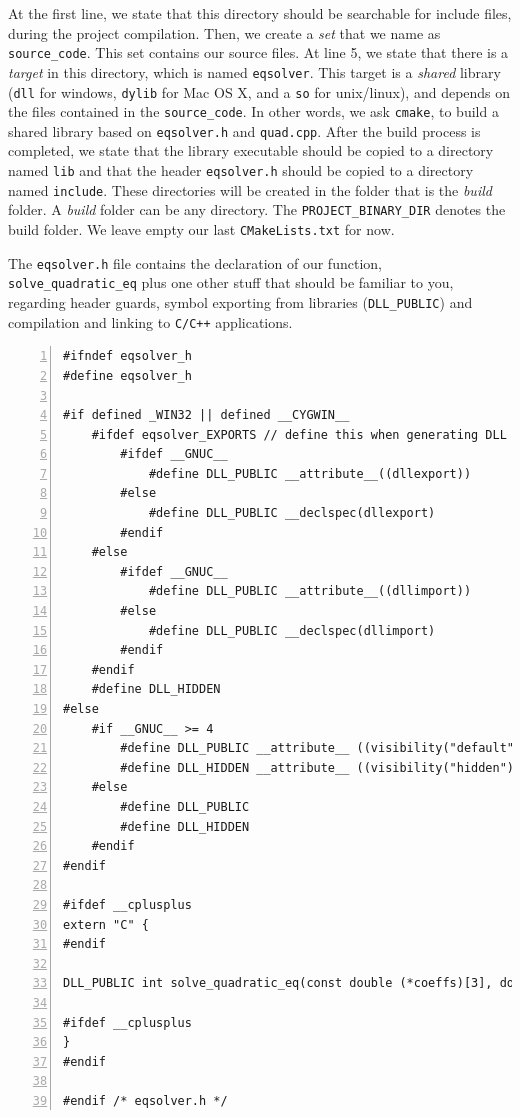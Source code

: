 \documentclass[12pt,a4paper]{article}
\begin{document}
At the first line, we state that this directory should be searchable for include files, during the project compilation. Then, we create a \emph{set} that we name as \verb+source_code+. This set contains our source files. At line 5, we state that there is a \emph{target} in this directory, which is named \verb+eqsolver+. This target is a \emph{shared} library (\verb+dll+ for windows, \verb+dylib+ for Mac OS X, and a \verb+so+ for unix/linux), and depends on the files contained in the \verb+source_code+. In other words, we ask \verb+cmake+, to build a shared library based on \verb+eqsolver.h+ and \verb+quad.cpp+. After the build process is completed, we state that the library executable should be copied to a directory named \verb+lib+ and that the header \verb+eqsolver.h+ should be copied to a directory named \verb+include+. These directories will be created in the folder that is the \emph{build} folder. A \emph{build} folder can be any directory. The \verb+PROJECT_BINARY_DIR+ denotes the build folder. We leave empty our last \verb+CMakeLists.txt+ for now. 

The \verb+eqsolver.h+ file contains the declaration of our function, \verb+solve_quadratic_eq+ plus one other stuff that should be familiar to you, regarding header guards, symbol exporting from libraries (\verb+DLL_PUBLIC+) and compilation and linking to \verb|C/C++| applications.

\lstset{language=C++}
\begin{lstlisting}[basicstyle=\small, numbers=left,caption=eqsolver.h,columns=flexible,keywordstyle=\color{black}\ttfamily]
#ifndef eqsolver_h
#define eqsolver_h

#if defined _WIN32 || defined __CYGWIN__
	#ifdef eqsolver_EXPORTS // define this when generating DLL
		#ifdef __GNUC__
			#define DLL_PUBLIC __attribute__((dllexport))
		#else
			#define DLL_PUBLIC __declspec(dllexport)
		#endif 
	#else
		#ifdef __GNUC__
			#define DLL_PUBLIC __attribute__((dllimport))
		#else
			#define DLL_PUBLIC __declspec(dllimport)
		#endif
	#endif
	#define DLL_HIDDEN 
#else
	#if __GNUC__ >= 4
		#define DLL_PUBLIC __attribute__ ((visibility("default"))) 
		#define DLL_HIDDEN __attribute__ ((visibility("hidden")))
	#else
		#define DLL_PUBLIC 
		#define DLL_HIDDEN
	#endif
#endif

#ifdef __cplusplus
extern "C" {
#endif

DLL_PUBLIC int solve_quadratic_eq(const double (*coeffs)[3], double (*roots)[4]);

#ifdef __cplusplus
}
#endif

#endif /* eqsolver.h */
\end{lstlisting}
\end{document}
